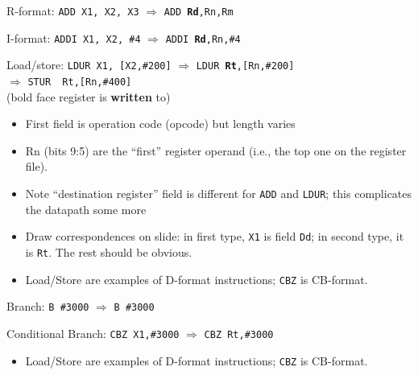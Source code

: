 \begin{frame}[fragile]


 R-format: {\tt ADD X1, X2, X3} $\Rightarrow$ {\tt ADD {\bf Rd},Rn,Rm}\smallskip

 I-format: {\tt ADDI X1, X2, \#4} $\Rightarrow$ {\tt ADDI {\bf Rd},Rn,\#4} \smallskip

Load/store: {\tt LDUR X1, [X2,\#200]} $\Rightarrow$ {\tt LDUR {\bf Rt},[Rn,\#200]}\\

\hspace*{1in}{\tt STUR X1, [X2,\#400]} $\Rightarrow$ {\tt STUR { Rt},[Rn,\#400]}\\

\medskip
(bold face register is \textbf{written} to)

\BNotes\ifnum{}
\begin{itemize}
\item First field is operation code (opcode) but length varies

\item Rn (bits 9:5) are the ``first'' register operand (i.e., the top
  one on the register file).
  
\item Note ``destination register'' field is different for {\tt ADD}
and {\tt LDUR}; this complicates the datapath some more

\item Draw correspondences on slide: in first type, {\tt X1} is
	field {\tt Dd}; in second type, it is {\tt Rt}. The rest should be
	obvious.
\item Load/Store are examples of D-format instructions; {\tt CBZ} is CB-format.
\end{itemize}
\fi\ENotes
\end{frame}
\begin{frame}[fragile]
  


Branch: {\tt B \#3000} $\Rightarrow$ {\tt B \#3000}\smallskip

Conditional Branch: {\tt CBZ X1,\#3000} $\Rightarrow$ {\tt CBZ Rt,\#3000}

\medskip

\BNotes\ifnum{}
\begin{itemize}
\item Load/Store are examples of D-format instructions; {\tt CBZ} is CB-format.
\end{itemize}
\fi\ENotes
\end{frame}

